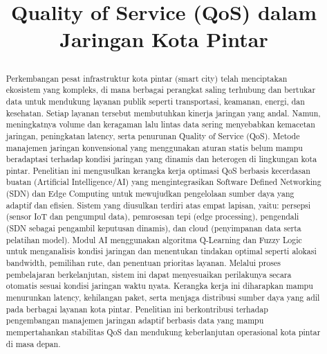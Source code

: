 \documentclass[a4paper,conference]{IEEEtran}
\begin{document}
\title{Quality of Service (QoS) dalam Jaringan Kota Pintar

}

\author{
}



\maketitle

\begin{abstract}

Perkembangan pesat infrastruktur kota pintar (smart city) telah menciptakan ekosistem yang kompleks, di mana berbagai perangkat saling terhubung dan bertukar data untuk mendukung layanan publik seperti transportasi, keamanan, energi, dan kesehatan. Setiap layanan tersebut membutuhkan kinerja jaringan yang andal. Namun, meningkatnya volume dan keragaman lalu lintas data sering menyebabkan kemacetan jaringan, peningkatan latency, serta penurunan Quality of Service (QoS). Metode manajemen jaringan konvensional yang menggunakan aturan statis belum mampu beradaptasi terhadap kondisi jaringan yang dinamis dan heterogen di lingkungan kota pintar.
Penelitian ini mengusulkan kerangka kerja optimasi QoS berbasis kecerdasan buatan (Artificial Intelligence/AI) yang mengintegrasikan Software Defined Networking (SDN) dan Edge Computing untuk mewujudkan pengelolaan sumber daya yang adaptif dan efisien. Sistem yang diusulkan terdiri atas empat lapisan, yaitu: persepsi (sensor IoT dan pengumpul data), pemrosesan tepi (edge processing), pengendali (SDN sebagai pengambil keputusan dinamis), dan cloud (penyimpanan data serta pelatihan model). Modul AI menggunakan algoritma Q-Learning dan Fuzzy Logic untuk menganalisis kondisi jaringan dan menentukan tindakan optimal seperti alokasi bandwidth, pemilihan rute, dan penentuan prioritas layanan.
Melalui proses pembelajaran berkelanjutan, sistem ini dapat menyesuaikan perilakunya secara otomatis sesuai kondisi jaringan waktu nyata. Kerangka kerja ini diharapkan mampu menurunkan latency, kehilangan paket, serta menjaga distribusi sumber daya yang adil pada berbagai layanan kota pintar. Penelitian ini berkontribusi terhadap pengembangan manajemen jaringan adaptif berbasis data yang mampu mempertahankan stabilitas QoS dan mendukung keberlanjutan operasional kota pintar di masa depan.

\end{abstract}
\end{document}

